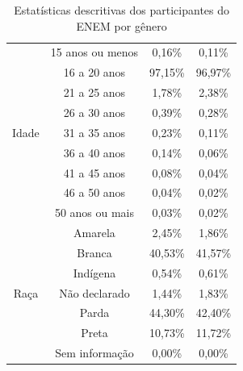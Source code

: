 \begin{table}[h]
\begin{tabular}{cccc}
    \multirow{9}{*}{Idade}                      & 15 anos ou menos          & 0,16\%            & 0,11\%             \\ \cline{2-4} 
                                                & 16 a 20 anos              & 97,15\%           & 96,97\%            \\ \cline{2-4} 
                                                & 21 a 25 anos              & 1,78\%            & 2,38\%             \\ \cline{2-4} 
                                                & 26 a 30 anos              & 0,39\%            & 0,28\%             \\ \cline{2-4} 
                                                & 31 a 35 anos              & 0,23\%            & 0,11\%             \\ \cline{2-4} 
                                                & 36 a 40 anos              & 0,14\%            & 0,06\%             \\ \cline{2-4} 
                                                & 41 a 45 anos              & 0,08\%            & 0,04\%             \\ \cline{2-4} 
                                                & 46 a 50 anos              & 0,04\%            & 0,02\%             \\ \cline{2-4} 
                                                & 50 anos ou mais           & 0,03\%            & 0,02\%             \\ \hline
    \multirow{7}{*}{Raça}                       & Amarela                   & 2,45\%            & 1,86\%             \\ \cline{2-4} 
                                                & Branca                    & 40,53\%           & 41,57\%            \\ \cline{2-4} 
                                                & Indígena                  & 0,54\%            & 0,61\%             \\ \cline{2-4} 
                                                & Não declarado             & 1,44\%            & 1,83\%             \\ \cline{2-4} 
                                                & Parda                     & 44,30\%           & 42,40\%            \\ \cline{2-4} 
                                                & Preta                     & 10,73\%           & 11,72\%            \\ \cline{2-4} 
                                                & Sem informação            & 0,00\%            & 0,00\%             \\ \hline
    \end{tabular}
    \caption{Estatísticas descritivas dos participantes do ENEM por gênero}
    \label{tab:estatistica-enem}
    \end{table}

